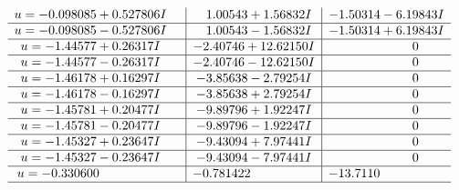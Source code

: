 \documentclass[1p]{elsarticle_modified}
\theoremstyle{definition}
\begin{document}
$$\begin{array}{c|c|c}
\begin{aligned}
u &= -0.098085 + 0.527806 I\end{aligned}
 & \phantom{-}1.00543 + 1.56832 I & -1.50314 - 6.19843 I \\ \hline\begin{aligned}
u &= -0.098085 - 0.527806 I\end{aligned}
 & \phantom{-}1.00543 - 1.56832 I & -1.50314 + 6.19843 I \\ \hline\begin{aligned}
u &= -1.44577 + 0.26317 I\end{aligned}
 & -2.40746 + 12.62150 I & \phantom{-0.000000 } 0 \\ \hline\begin{aligned}
u &= -1.44577 - 0.26317 I\end{aligned}
 & -2.40746 - 12.62150 I & \phantom{-0.000000 } 0 \\ \hline\begin{aligned}
u &= -1.46178 + 0.16297 I\end{aligned}
 & -3.85638 - 2.79254 I & \phantom{-0.000000 } 0 \\ \hline\begin{aligned}
u &= -1.46178 - 0.16297 I\end{aligned}
 & -3.85638 + 2.79254 I & \phantom{-0.000000 } 0 \\ \hline\begin{aligned}
u &= -1.45781 + 0.20477 I\end{aligned}
 & -9.89796 + 1.92247 I & \phantom{-0.000000 } 0 \\ \hline\begin{aligned}
u &= -1.45781 - 0.20477 I\end{aligned}
 & -9.89796 - 1.92247 I & \phantom{-0.000000 } 0 \\ \hline\begin{aligned}
u &= -1.45327 + 0.23647 I\end{aligned}
 & -9.43094 + 7.97441 I & \phantom{-0.000000 } 0 \\ \hline\begin{aligned}
u &= -1.45327 - 0.23647 I\end{aligned}
 & -9.43094 - 7.97441 I & \phantom{-0.000000 } 0 \\ \hline\begin{aligned}
u &= -0.330600\phantom{ +0.000000I}\end{aligned}
 & -0.781422\phantom{ +0.000000I} & -13.7110\phantom{ +0.000000I}\\
 \hline 
 \end{array}$$\newpage
\end{document}

